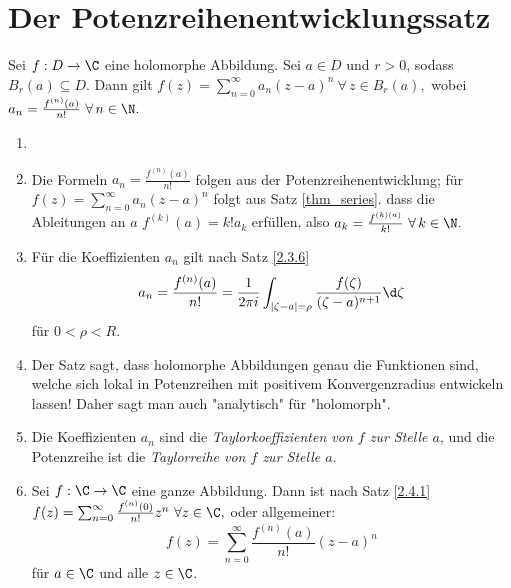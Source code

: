 \section{Der Potenzreihenentwicklungssatz}\lecture
		
		\begin{thm}\label{2.4.1}
			Sei $ f: D \to \C $ eine holomorphe Abbildung. Sei $ a \in D $ und $r>0$, sodass $ B_r(a) \subseteq D $. Dann gilt $ f(z) = \sum_{n=0}^\infty a_n(z-a)^n\ \forall \, z \in B_r(a), $ wobei $ a_n = \frac{f^{(n)}(a)}{n!}\ \forall\, n \in \N. $
		\end{thm}
		
		\begin{rem*}
			\begin{enumerate}
				\item[]
				\item Die Formeln $ a_n = \frac{f^{(n)}(a)}{n!} $ folgen aus der Potenzreihenentwicklung; für $ f(z) = \sum_{n=0}^\infty a_n(z-a)^n $ folgt aus Satz \ref{thm_series}. dass die Ableitungen an $a$ $ f^{(k)}(a) = k!a_k $ erfüllen, also $ a_k = \frac{f^{(k)(a)}}{k!}\ \forall\, k \in \N. $
				\item Für die Koeffizienten $a_n$ gilt nach Satz \ref{2.3.6} 
				$$ a_n = \frac{f^{(n)}(a)}{n!} = \frac{1}{2 \pi i} \int_{|\zeta-a|=\rho} \frac{f(\zeta)}{(\zeta-a)^{n+1}} \d \zeta $$
				für $ 0 < \rho < R $.
				\item Der Satz sagt, dass holomorphe Abbildungen genau die Funktionen sind, welche sich lokal in Potenzreihen mit positivem Konvergenzradius entwickeln lassen! Daher sagt man auch "analytisch" für "holomorph".
				\item Die Koeffizienten $a_n$ sind die \emph{Taylorkoeffizienten von $f$ zur Stelle $a$}, und die Potenzreihe ist die \emph{Taylorreihe von $f$ zur Stelle $a$}.
				\item Sei $ f: \C \to \C $ eine ganze Abbildung. Dann ist nach Satz \ref{2.4.1} $ f(z) = \sum_{n=0}^\infty \frac{f^{(n)}(0)}{n!} z^n\ \forall z \in \C, $ oder allgemeiner:
				\[ f(z) = \sum_{n=0}^\infty \frac{f^{(n)}(a)}{n!} (z-a)^n \]
				für $a \in \C$ und alle $z \in \C$.
			\end{enumerate}
		\end{rem*}